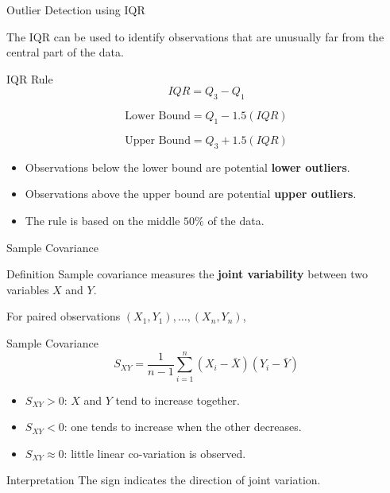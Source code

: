 \documentclass{beamer}
\begin{document}

\begin{frame}{Outlier Detection using IQR}

The IQR can be used to identify observations that are
unusually far from the central part of the data.

\begin{block}{IQR Rule}
\[
IQR=Q_3-Q_1
\]

\[
\boxed{
\text{Lower Bound}=Q_1-1.5(IQR)
}
\]

\[
\boxed{
\text{Upper Bound}=Q_3+1.5(IQR)
}
\]
\end{block}

\begin{itemize}
    \item Observations below the lower bound are potential
          \textbf{lower outliers}.
    \item Observations above the upper bound are potential
          \textbf{upper outliers}.
    \item The rule is based on the middle $50\%$ of the data.
\end{itemize}

\end{frame}


\begin{frame}{Sample Covariance}

\begin{block}{Definition}
Sample covariance measures the \textbf{joint variability} between
two variables $X$ and $Y$.
\end{block}

For paired observations $(X_1,Y_1),\ldots,(X_n,Y_n)$,

\begin{block}{Sample Covariance}
\[
\boxed{
S_{XY}
=
\frac{1}{n-1}
\sum_{i=1}^{n}
(X_i-\bar X)(Y_i-\bar Y)
}
\]
\end{block}

\begin{itemize}
    \item $S_{XY}>0$: $X$ and $Y$ tend to increase together.
    \item $S_{XY}<0$: one tends to increase when the other decreases.
    \item $S_{XY}\approx0$: little linear co-variation is observed.
\end{itemize}

\begin{block}{Interpretation}
The sign indicates the direction of joint variation.
\end{block}

\end{frame}
\end{document}
